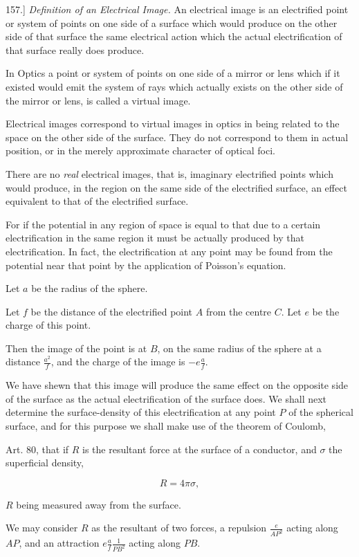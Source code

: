 \documentclass[11pt,a4paper]{article}
\begin{document}
157.] \emph{Definition of an Electrical Image.} An electrical image is an electrified point or system of points on one side of a surface which would produce on the other side of that surface the same electrical action which the actual electrification of that surface really does produce.

In Optics a point or system of points on one side of a mirror or lens which if it existed would emit the system of rays which actually exists on the other side of the mirror or lens, is called a virtual image.

Electrical images correspond to virtual images in optics in being related to the space on the other side of the surface. They do not correspond to them in actual position, or in the merely approximate character of optical foci.

There are no \emph{real} electrical images, that is, imaginary electrified points which would produce, in the region on the same side of the electrified surface, an effect equivalent to that of the electrified surface.

For if the potential in any region of space is equal to that due to a certain electrification in the same region it must be actually produced by that electrification. In fact, the electrification at any point may be found from the potential near that point by the application of Poisson's equation.

Let $a$ be the radius of the sphere.

Let $f$ be the distance of the electrified point $A$ from the centre $C$. Let $e$ be the charge of this point.

Then the image of the point is at $B$, on the same radius of the sphere at a distance $\frac{a^2}{f}$, and the charge of the image is $-e\frac{a}{f}$.

We have shewn that this image will produce the same effect on the opposite side of the surface as the actual electrification of the surface does. We shall next determine the surface-density of this electrification at any point $P$ of the spherical surface, and for this purpose we shall make use of the theorem of Coulomb,

Art. 80, that if $R$ is the resultant force at the surface of a conductor, and $\sigma$ the superficial density,

\[
R=4\pi\sigma,
\]

$R$ being measured away from the surface.

We may consider $R$ as the resultant of two forces, a repulsion $\frac{e}{AP^2}$ acting along $AP$, and an attraction $e\frac{a}{f}\frac{1}{PB^2}$ acting along $PB$.
\end{document}
